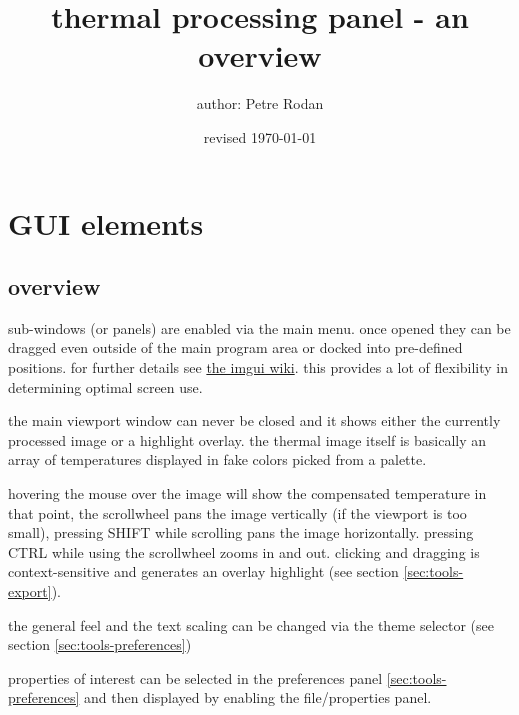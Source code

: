 \documentclass[12pt,twoside,a4paper,notitlepage]{report}
\makeatletter
\newcommand*{\toccontents}{\@starttoc{toc}}
\makeatother
\begin{document}
 


\fancyhf{}

\fancyhead{} %
\fancyhead[LO]{\rightmark }
\fancyhead[RE]{\leftmark }
\fancyhead[LE,RO]{\thepage }

\title{\textbf{thermal processing panel} - an overview}
\author{author: Petre Rodan}
\date{revised \today}
\maketitle
\toccontents

\chapter{GUI elements}

\section{overview}

sub-windows (or panels) are enabled via the main menu. once opened they can be dragged even outside of the main program area or docked into pre-defined positions. for further details see \href{https://github.com/ocornut/imgui/wiki/Docking}{the imgui wiki}. this provides a lot of flexibility in determining optimal screen use.

the main viewport window can never be closed and it shows either the currently processed image or a highlight overlay. the thermal image itself is basically an array of temperatures displayed in fake colors picked from a palette.

hovering the mouse over the image will show the compensated temperature in that point, the scrollwheel pans the image vertically (if the viewport is too small),  pressing SHIFT while scrolling pans the image horizontally. pressing CTRL while using the scrollwheel zooms in and out. clicking and dragging is context-sensitive and generates an overlay highlight  (see section \ref{sec:tools-export}).

the general feel and the text scaling can be changed via the theme selector (see section \ref{sec:tools-preferences})

properties of interest can be selected in the preferences panel \ref{sec:tools-preferences} and then displayed by enabling the file/properties panel.
\end{document}
